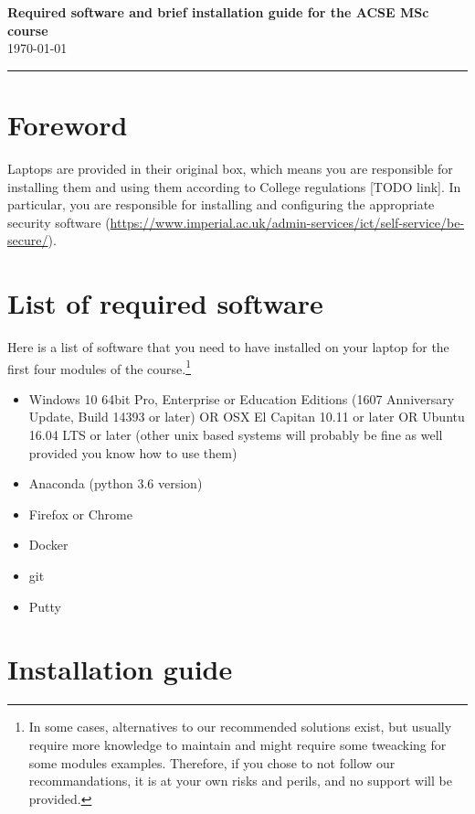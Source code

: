 \documentclass[11pt]{article}
\begin{document}
\begin{center}
{\bf \Large Required software and brief installation guide for the ACSE MSc course } \\ \today
\end{center}
\hrule
\vspace*{1cm}


\section{Foreword}

Laptops are provided in their original box, which means you are responsible for installing them and using them according to College regulations [TODO link]. In particular, you are responsible for installing and configuring the appropriate security software (\url{https://www.imperial.ac.uk/admin-services/ict/self-service/be-secure/}).

\section{List of required software}

Here is a list of  software that you need to have installed on your laptop for the first four modules of the course.\footnote{In some cases, alternatives to our recommended solutions exist, but usually require more knowledge to maintain and might require some tweacking for some modules examples. Therefore, if you chose to not follow our recommandations, it is at your own risks and perils, and no support will be provided.}

\begin{itemize}
  \item Windows 10  64bit Pro, Enterprise or Education Editions (1607 Anniversary Update, Build 14393 or later) OR OSX  El Capitan 10.11 or later OR Ubuntu 16.04 LTS or later (other unix based systems will probably be fine as well provided you know how to use them)
  \item Anaconda (python 3.6 version)
  \item Firefox or Chrome
  \item Docker
  \item git
  \item Putty
\end{itemize}


\section{Installation guide}
\end{document}
